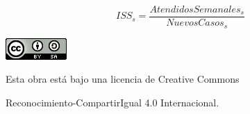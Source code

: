 \documentclass[
  11pt,
]{article}
\begin{document}
\[
ISS_s = \frac{AtendidosSemanales_s}{NuevosCasos_{s}}
\]

\vspace{4cm}

\begin{center}
\includegraphics{cc.png}
\end{center}

\vspace{0.2cm}

\begin{center}
Esta obra está bajo una licencia de Creative Commons 
\end{center}

\begin{center}
Reconocimiento-CompartirIgual 4.0 Internacional.
\end{center}
\end{document}
